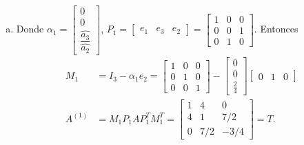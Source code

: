\begin{frame}
	\begin{solution}
		\begin{enumerate}[b)]
			\item

			      Donde
			      \begin{math}
				      \alpha_{1}=
				      \begin{bmatrix}
					      0 \\
					      0 \\
					      \dfrac{\widehat{a_{3}}}{\widehat{a_{2}}}
				      \end{bmatrix}
			      \end{math},
			      \begin{math}
				      P_{1}=
				      \begin{bmatrix}
					      e_{1} & e_{3} & e_{2}
				      \end{bmatrix}=
				      \begin{bmatrix}
					      1 & 0 & 0 \\
					      0 & 0 & 1 \\
					      0 & 1 & 0
				      \end{bmatrix}
			      \end{math}.
			      Entonces
			      \begin{align*}
				      M_{1}              & =
				      I_{3}-\alpha_{1}e_{2}=
				      \begin{bmatrix}
					      1 & 0 & 0 \\
					      0 & 1 & 0 \\
					      0 & 0 & 1
				      \end{bmatrix}-
				      \begin{bmatrix}
					      0 \\
					      0 \\
					      \frac{2}{4}
				      \end{bmatrix}
				      \begin{bmatrix}
					      0 & 1 & 0
				      \end{bmatrix}         \\
				      A^{\left(1\right)} & =
				      M_{1}
				      P_{1}
				      A
				      P_{1}^{T}
				      M_{1}^{T}=
				      \begin{bmatrix}
					      1 & 4   & 0    \\
					      4 & 1   & 7/2  \\
					      0 & 7/2 & -3/4
				      \end{bmatrix}=T.

\end{align*}
\end{enumerate}
\end{solution}
\end{frame}
